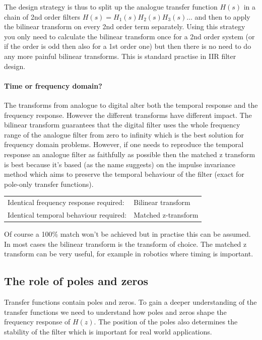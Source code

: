 \documentclass[12pt,a4paper]{article}
\begin{document}
The design strategy is thus to split up the analogue transfer function
$H(s)$ in a chain of 2nd order filters $H(s) = H_1(s) H_2(s) H_3(s)
\ldots$ and then to apply the bilinear transform on every 2nd order
term separately. Using this strategy you only need to calculate the bilinear
transform once for a 2nd order system (or if the order is odd then
also for a 1st order one) but then there is no need to do any more
painful bilinear transforms. This is standard practise in IIR filter
design.

\paragraph{Time or frequency domain?}
The transforms from analogue to digital alter both the temporal
response and the frequency response. However the different transforms
have different impact. The bilinear transform guarantees that the
digital filter uses the whole frequency range of the analogue filter
from zero to infinity which is the best solution for frequency domain
problems. However, if one needs to reproduce the temporal response an
analogue filter as faithfully as possible then the matched z transform
is best because it's based (as the name suggests) on the impulse
invariance method which aims to preserve the temporal behaviour of the
filter (exact for pole-only transfer functions).

\begin{center}
\begin{tabular}{ll}
  Identical frequency response required: & Bilinear transform \\
  Identical temporal behaviour required: & Matched z-transform \\
\end{tabular}
\end{center}

Of course a 100\% match won't be achieved but in practise this
can be assumed. In most cases the bilinear transform is the
transform of choice. The matched z transform can be very useful,
for example in robotics where timing is important.


\subsection{The role of poles and zeros}
Transfer functions contain poles and zeros. To gain a deeper
understanding of the transfer functions we need to understand
how poles and zeros shape the frequency response of $H(z)$.
The position of the poles also determines the stability of the filter
which is important for real world applications.
\end{document}
